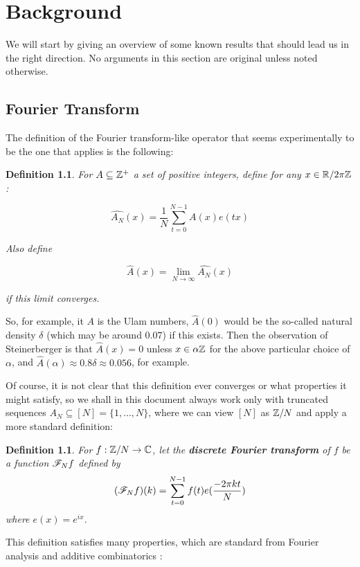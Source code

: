 \documentclass{report}
\newtheorem{definition}[theorem]{Definition}
\theoremstyle{remark}
\numberwithin{equation}{section}
\begin{document}
\chapter{Background}

We will start by giving an overview of some known results that should
lead us in the right direction.  No arguments in this section are
original unless noted otherwise.

\section{Fourier Transform}

The definition of the Fourier transform-like operator that seems
experimentally to be the one that applies is the following:

\begin{definition}
For $A \subseteq \mathbb{Z}^+$ a set of positive integers, define for any
$x\in \mathbb{R}/2\pi\mathbb{Z}$: 

\[\widehat{A_N}(x) = \frac{1}{N} \sum_{t=0}^{N-1} A(x) e(tx)\]

Also define 

\[\widehat{A}(x) = \lim_{N \to \infty} \widehat{A_N}(x)\]

if this limit converges.  
\end{definition}

So, for example, it $A$ is the Ulam numbers, $\widehat{A}(0)$ would be
the so-called natural density $\delta$ (which may be around $0.07$) if
this exists.  Then the observation of Steinerberger is that
$\widehat{A}(x) = 0$ unless $x \in \alpha\mathbb{Z}$ for the above particular
choice of $\alpha$, and
$\widehat{A}(\alpha) \approx 0.8\delta \approx 0.056$, for example.

Of course, it is not clear that this definition ever converges or what
properties it might satisfy, so we shall in this document always work
only with truncated sequences $A_N \subseteq [N] = \{1, \ldots, N\}$,
where we can view $[N]$ as $\mathbb{Z}/N$ and apply a more standard
definition:

\begin{definition}
  For $f : \mathbb{Z}/N \to \mathbb{C}$, let the \textbf{discrete Fourier transform}
  of $f$ be a function $\mathscr{F}_N f$ defined by
  \[(\mathscr{F}_N f)(k) = \sum_{t=0}^{N-1} f(t) e(\frac{-2\pi k t}{N})\]
  where $e(x) = e^{ix}$.
\end{definition}

This definition satisfies many properties, which are standard from
Fourier analysis and additive combinatorics \cite{tao:cup2006}:
\end{document}
